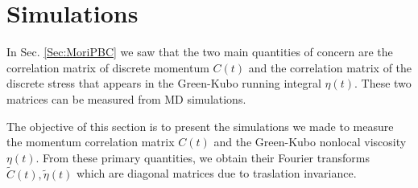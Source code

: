 \documentclass[b5paper,openright,10pt]{book}
\begin{document}
\section{Simulations}
\label{Sec:SimPBC}
In Sec. \ref{Sec:MoriPBC} we saw that the  two main  quantities of  concern  are the  correlation matrix  of
discrete momentum  $C(t)$ and the  correlation matrix of  the discrete
stress  that appears  in  the Green-Kubo  running integral  $\eta(t)$.
These two  matrices can be measured  from MD simulations.

The objective of this section is to present the simulations we made to measure the
momentum  correlation  matrix  $C(t)$  and  the  Green-Kubo  nonlocal
viscosity $\eta(t)$.   From these primary quantities,  we obtain their
Fourier transforms  $\tilde{C}(t),\tilde{\eta}(t)$ which  are diagonal
matrices  due to  traslation invariance.  
\end{document}
